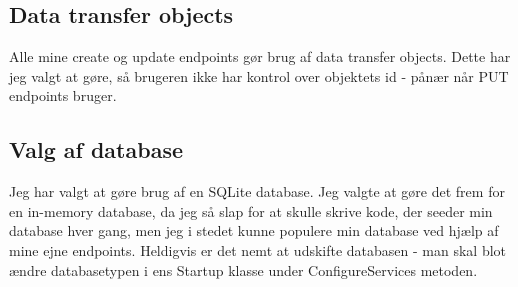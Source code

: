 \documentclass[a4paper]{article}
\begin{document}
\subsection*{Data transfer objects}
Alle mine create og update endpoints gør brug af data transfer objects.
Dette har jeg valgt at gøre, så brugeren ikke har kontrol over objektets id - pånær når PUT endpoints bruger.

\subsection*{Valg af database}
Jeg har valgt at gøre brug af en SQLite database.
Jeg valgte at gøre det frem for en in-memory database, da jeg så slap for at skulle skrive kode, der seeder min database hver gang, men jeg i stedet kunne populere min database ved hjælp af mine ejne endpoints.
Heldigvis er det nemt at udskifte databasen - man skal blot ændre databasetypen i ens Startup klasse under ConfigureServices metoden.
\end{document}
